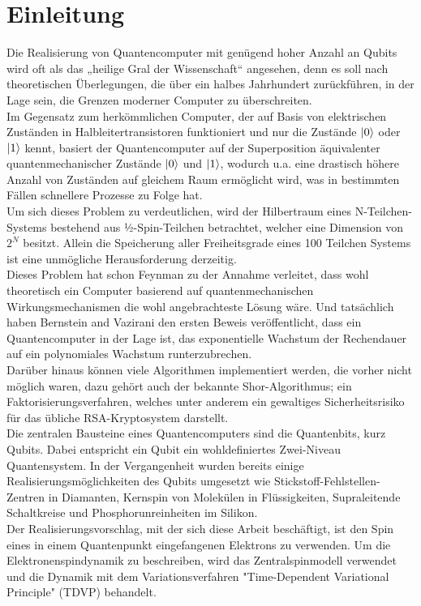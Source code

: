 \chapter{Einleitung}
Die Realisierung von Quantencomputer mit genügend hoher Anzahl an Qubits wird oft als das „heilige Gral der Wissenschaft“ angesehen, denn 
es soll nach theoretischen Überlegungen, die über ein halbes Jahrhundert zurückführen, in der Lage sein, die Grenzen moderner Computer zu 
überschreiten. \\
Im Gegensatz zum herkömmlichen Computer, der auf Basis von elektrischen Zuständen in Halbleitertransistoren funktioniert 
und nur die Zustände $\ket{0}$ oder $\ket{1}$ kennt, basiert der Quantencomputer auf der Superposition äquivalenter 
quantenmechanischer Zustände $\ket{0}$ und $\ket{1}$, wodurch u.a. eine drastisch höhere Anzahl von Zuständen auf gleichem Raum ermöglicht 
wird, was in bestimmten Fällen schnellere Prozesse zu Folge hat.\\
Um sich dieses Problem zu verdeutlichen, wird der Hilbertraum eines N-Teilchen-Systems bestehend aus ½-Spin-Teilchen betrachtet, welcher eine 
Dimension von $2^N$ besitzt. Allein die Speicherung aller Freiheitsgrade eines 100 Teilchen Systems ist eine unmögliche Herausforderung
derzeitig. \\
Dieses Problem hat schon Feynman zu der Annahme verleitet, dass wohl theoretisch ein Computer basierend 
auf quantenmechanischen Wirkungsmechanismen die wohl angebrachteste Lösung wäre. Und tatsächlich haben Bernstein and Vazirani 
den ersten Beweis veröffentlicht, dass ein Quantencomputer in der Lage ist, das exponentielle Wachstum der Rechendauer auf ein 
polynomiales Wachstum runterzubrechen\cite{10.1145/167088.167097}.\\
Darüber hinaus können viele Algorithmen implementiert werden, die vorher nicht möglich waren, dazu gehört auch der bekannte Shor-Algorithmus; 
ein Faktorisierungsverfahren, welches unter anderem ein gewaltiges Sicherheitsrisiko für das übliche RSA-Kryptosystem darstellt\cite{365700,10.1137/S0097539795293172}.\\

\noindent Die zentralen Bausteine eines Quantencomputers sind die Quantenbits, kurz Qubits. Dabei entspricht ein Qubit ein wohldefiniertes
Zwei-Niveau Quantensystem. In der Vergangenheit wurden bereits einige Realisierungsmöglichkeiten des Qubits umgesetzt wie Stickstoff-Fehlstellen-Zentren 
in Diamanten\cite{PhysRevLett.93.130501,Hanson2008-tn}, Kernspin von Molekülen in Flüssigkeiten\cite{RevModPhys.76.1037},
Supraleitende Schaltkreise\cite{RevModPhys.73.357} und Phosphorunreinheiten im Silikon\cite{Kane1998-pc}.\\
Der Realisierungsvorschlag, mit der sich diese Arbeit beschäftigt, ist den Spin eines in einem Quantenpunkt eingefangenen 
Elektrons zu verwenden\cite{Elzerman2004-wu,Bonadeo1998-nr,PMID:17901328,Fokina_2010,Spatzek2011-rn}. Um die Elektronenspindynamik zu beschreiben, wird 
das Zentralspinmodell verwendet und die Dynamik mit dem Variationsverfahren "Time-Dependent Variational Principle" (TDVP) behandelt.\\


